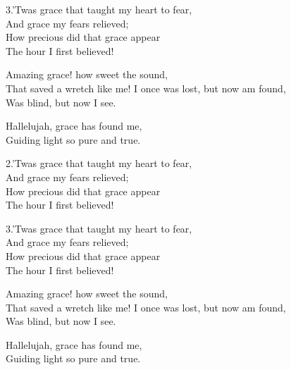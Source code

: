 \documentclass[12pt]{article}
\begin{document}
\begin{stanza}
3.’Twas grace that taught my heart to fear,\\
And grace my fears relieved;\\
How precious did that grace appear\\
The hour I first believed!
\end{stanza}

\HymnBreak


\begin{stanza}
Amazing grace! how sweet the sound,\\
That saved a wretch like me!
I once was lost, but now am found,\\
Was blind, but now I see.
\end{stanza}

\begin{chorus}
Hallelujah, grace has found me,\\
Guiding light so pure and true.
\end{chorus}

\begin{stanza}
2.’Twas grace that taught my heart to fear,\\
And grace my fears relieved;\\
How precious did that grace appear\\
The hour I first believed!
\end{stanza}

\begin{stanza}
3.’Twas grace that taught my heart to fear,\\
And grace my fears relieved;\\
How precious did that grace appear\\
The hour I first believed!
\end{stanza}

\HymnBreak


\begin{stanza}
Amazing grace! how sweet the sound,\\
That saved a wretch like me!
I once was lost, but now am found,\\
Was blind, but now I see.
\end{stanza}

\begin{chorus}
Hallelujah, grace has found me,\\
Guiding light so pure and true.
\end{chorus}
\end{document}
